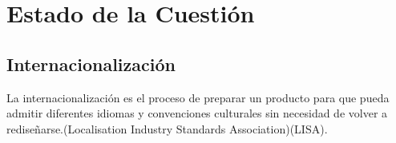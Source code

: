 \chapter{Estado de la Cuestión}
\label{cap:estadoDeLaCuestion}






\section{Internacionalización}
La internacionalización es el proceso de preparar un producto para que pueda admitir diferentes idiomas y convenciones culturales sin necesidad de volver a rediseñarse.(Localisation Industry Standards Association)(LISA).

